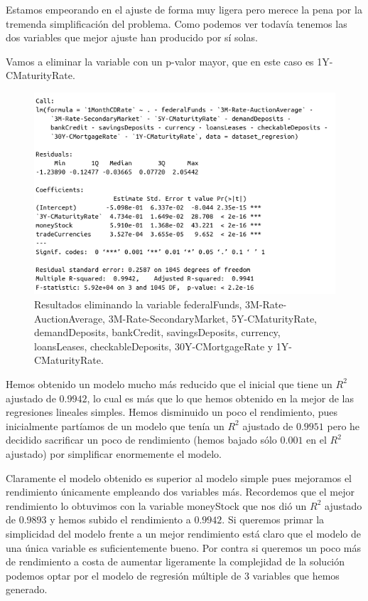 \documentclass[12pt,a4paper]{article}
\begin{document}
Estamos empeorando en el ajuste de forma muy ligera pero merece la pena por la tremenda simplificación del problema. Como podemos ver todavía tenemos las dos variables que mejor ajuste han producido por sí solas.

Vamos a eliminar la variable con un p-valor mayor, que en este caso es 1Y-CMaturityRate.

\begin{figure}[H]
	\centering 
	\includegraphics[scale=0.6]{./Imagenes/Regresion/regresion_multiple13.png}
	\caption{Resultados eliminando la variable federalFunds, 3M-Rate-AuctionAverage, 3M-Rate-SecondaryMarket, 5Y-CMaturityRate, demandDeposits, bankCredit, savingsDeposits, currency, loansLeases, checkableDeposits, 30Y-CMortgageRate y 1Y-CMaturityRate.}
\end{figure}

Hemos obtenido un modelo mucho más reducido que el inicial que tiene un $R^2$ ajustado de $0.9942$, lo cual es más que lo que hemos obtenido en la mejor de las regresiones lineales simples. Hemos disminuido un poco el rendimiento, pues inicialmente partíamos de un modelo que tenía un $R^2$ ajustado de $0.9951$ pero he decidido sacrificar un poco de rendimiento (hemos bajado sólo $0.001$ en el $R^2$ ajustado) por simplificar enormemente el modelo.

Claramente el modelo obtenido es superior al modelo simple pues mejoramos el rendimiento únicamente empleando dos variables más. Recordemos que el mejor rendimiento lo obtuvimos con la variable moneyStock que nos dió un $R^2$ ajustado de $0.9893$ y hemos subido el rendimiento a $0.9942$. Si queremos primar la simplicidad del modelo frente a un mejor rendimiento está claro que el modelo de una única variable es suficientemente bueno. Por contra si queremos un poco más de rendimiento a costa de aumentar ligeramente la complejidad de la solución podemos optar por el modelo de regresión múltiple de 3 variables que hemos generado.
\end{document}
